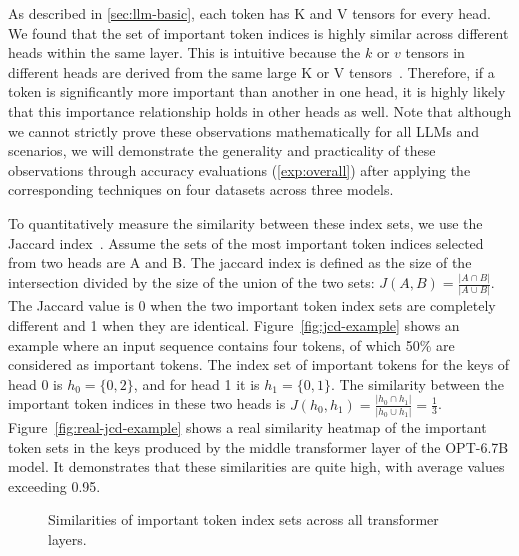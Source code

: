 As described in \cref{sec:llm-basic}, each token has K and V tensors for every head. We found that the set of important token indices is highly similar across different heads within the same layer. This is intuitive because the \( k\) or \( v \) tensors in different heads are derived from the same large K or V tensors~\cite{alluneed-nips17, opt-arxiv22}. Therefore, if a token is significantly more important than another in one head, it is highly likely that this importance relationship holds in other heads as well. Note that although we cannot strictly prove these observations mathematically for all LLMs and scenarios, we will demonstrate the generality and practicality of these observations through accuracy evaluations (\cref{exp:overall}) after applying the corresponding techniques on four datasets across three models.

To quantitatively measure the similarity between these index sets, we use the Jaccard index~\cite{jaccard-18}. Assume the sets of the most important token indices selected from two heads are A and B. The jaccard index is defined as the size of the intersection divided by the size of the union of the two sets: \( J(A, B) = \frac{|A \cap B|}{|A \cup B|} \). The Jaccard value is 0 when the two important token index sets are completely different and 1 when they are identical.
Figure~\ref{fig:jcd-example} shows an example where an input sequence contains four tokens, of which 50\%  are considered as important tokens. The index set of important tokens for the keys of head 0 is  \( h_0 = \{0, 2\} \), and for head 1 it is \( h_1 = \{0, 1\} \). The similarity between the important token indices in these two heads is \( J(h_0, h_1) = \frac{|h_0 \cap h_1|}{|h_0 \cup h_1|} = \frac{1}{3} \).
Figure~\ref{fig:real-jcd-example} shows a real similarity heatmap of the important token sets in the keys produced by the middle transformer layer of the OPT-6.7B model. It demonstrates that these similarities are quite high, with average values exceeding 0.95. 

\begin{figure}
	\centering
	\vspace{-0.1in}
	\caption{Similarities of important token index sets across all transformer layers.}
	\label{fig:simi-values}
	\vspace{-0.1in}
\end{figure}

